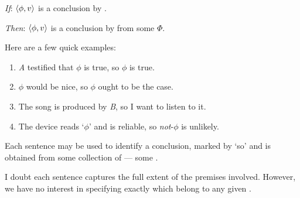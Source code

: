 \begin{note}
  \begin{assumption}
    \label{assu:concluding:pools}
    \vspace{-\baselineskip}
    \begin{itenum}
    \item[\emph{If}:]
      \(\langle \phi, v \rangle\) is a conclusion by \vAgent{}.
    \item[\emph{Then}:]
      \(\langle \phi, v \rangle\) is a conclusion by \vAgent{} from some \pool{} \(\Phi\).
    \end{itenum}
    \vspace{-\baselineskip}
  \end{assumption}

  \noindent%
  Here are a few quick examples:
  \begin{enumerate}[label=\arabic*., ref=(\arabic*), noitemsep]
  \item
    \emph{A} testified that \(\phi\) is true, so \(\phi\) is true.
  \item
    \(\phi\) would be nice, so \(\phi\) ought to be the case.
  \item
    The song is produced by \emph{B}, so I want to listen to it.
  \item
    The device reads `\(\phi\)' and is reliable, so \emph{not}-\(\phi\) is unlikely.
  \end{enumerate}
  Each sentence may be used to identify a conclusion, marked by `so' and is obtained from some collection of  --- some \pool{}.

  I doubt each sentence captures the full extent of the premises involved.
  However, we have no interest in specifying exactly which \evalN{} belong to any given \pool{}.
\end{note}

